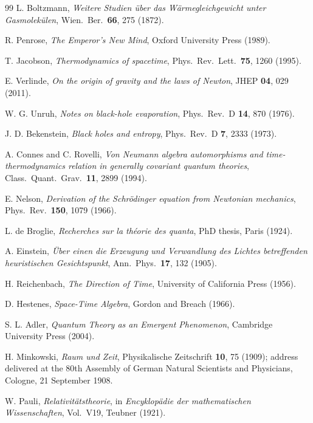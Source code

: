 \documentclass[11pt,a4paper]{article}
\begin{document}
\begin{thebibliography}{99}
 L. Boltzmann, \emph{Weitere Studien \"uber das W\"armegleichgewicht unter Gasmolek\"ulen}, Wien.\ Ber.\ \textbf{66}, 275 (1872).

 R. Penrose, \emph{The Emperor's New Mind}, Oxford University Press (1989).

 T. Jacobson, \emph{Thermodynamics of spacetime}, Phys.\ Rev.\ Lett.\ \textbf{75}, 1260 (1995).

 E. Verlinde, \emph{On the origin of gravity and the laws of Newton}, JHEP \textbf{04}, 029 (2011).

 W. G. Unruh, \emph{Notes on black-hole evaporation}, Phys.\ Rev.\ D \textbf{14}, 870 (1976).

 J. D. Bekenstein, \emph{Black holes and entropy}, Phys.\ Rev.\ D \textbf{7}, 2333 (1973).

 A. Connes and C. Rovelli, \emph{Von Neumann algebra automorphisms and time-thermodynamics relation in generally covariant quantum theories}, Class.\ Quant.\ Grav.\ \textbf{11}, 2899 (1994).

 E. Nelson, \emph{Derivation of the Schr\"odinger equation from Newtonian mechanics}, Phys.\ Rev.\ \textbf{150}, 1079 (1966).

 L. de Broglie, \emph{Recherches sur la th\'eorie des quanta}, PhD thesis, Paris (1924).

 A. Einstein, \emph{\"Uber einen die Erzeugung und Verwandlung des Lichtes betreffenden heuristischen Gesichtspunkt}, Ann.\ Phys.\ \textbf{17}, 132 (1905).

 H. Reichenbach, \emph{The Direction of Time}, University of California Press (1956).

 D. Hestenes, \emph{Space-Time Algebra}, Gordon and Breach (1966).

 S. L. Adler, \emph{Quantum Theory as an Emergent Phenomenon}, Cambridge University Press (2004).

 H. Minkowski, \emph{Raum und Zeit}, Physikalische Zeitschrift \textbf{10}, 75 (1909); address delivered at the 80th Assembly of German Natural Scientists and Physicians, Cologne, 21 September 1908.

 W. Pauli, \emph{Relativit\"atstheorie}, in \emph{Encyklop\"adie der mathematischen Wissenschaften}, Vol.\ V19, Teubner (1921).


\end{thebibliography}
\end{document}
